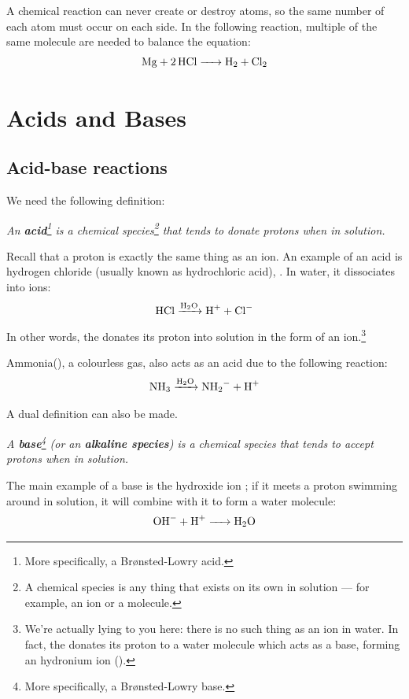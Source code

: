 \documentclass[a4paper]{memoir}
\begin{document}
A chemical reaction can never create or destroy atoms, so the same number of each atom must occur on each side. In the following reaction,
multiple of the same molecule are needed to balance the equation:
\begin{equation}
  \ce{Mg + 2HCl -> H2 + Cl2}
\end{equation}

\chapter{Acids and Bases}
\section{Acid-base reactions}
We need the following definition:

{\itshape
  An \textbf{acid}\footnote{More specifically, a Br{\o}nsted-Lowry acid.} is a chemical species\footnote{A chemical species is any thing that
  exists on its own in solution --- for example, an ion or a molecule.} that tends to donate protons when in solution.
}

Recall that a proton is exactly the same thing as an  ion. An example of an acid is hydrogen chloride (usually known as hydrochloric acid), . In
water, it dissociates into ions:
\begin{equation}
  \ce{HCl ->[H2O] H+ + Cl-}
\end{equation}
In other words, the  donates its proton into solution in the form of an  ion.\footnote{We're actually lying to you here: there is no such thing
as an  ion in water. In fact, the  donates its proton to a water molecule which acts as a base, forming an hydronium ion ().}

Ammonia(), a colourless gas, also acts as an acid due to the following reaction:
\begin{equation}
  \ce{NH3 ->[H2O] NH2- + H+}
\end{equation}

A dual definition can also be made.

{\itshape
  A \textbf{base}\footnote{More specifically, a Br{\o}nsted-Lowry base.} (or an \textbf{alkaline species}) is a chemical species that tends to accept
  protons when in solution.
}

The main example of a base is the hydroxide ion ; if it meets a proton swimming around in solution, it will combine with it to form a water molecule:
\begin{equation}
  \ce{OH- + H+ -> H2O}
\end{equation}
\end{document}

